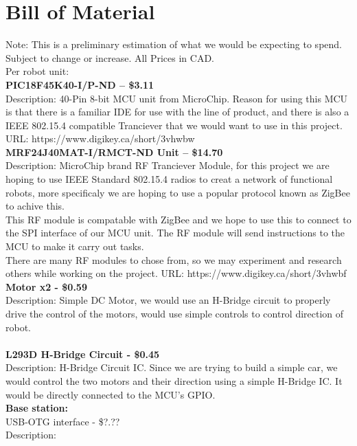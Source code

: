 \documentclass[a4paper]{article}
\begin{document}
	\section*{Bill of Material}
	Note: This is a preliminary estimation of what we would be expecting to spend. Subject to change or increase. All Prices in CAD. \\
	Per robot unit: \\
	
	\textbf{PIC18F45K40-I/P-ND – \$3.11} \\
	Description: 40-Pin 8-bit MCU unit from MicroChip. Reason for using this MCU is that there is a familiar IDE for use with the line of product, and there is also a IEEE 802.15.4 compatible Tranciever that we would want to use in this project.
	URL: https://www.digikey.ca/short/3vhwbw \\
	
	\textbf{MRF24J40MAT-I/RMCT-ND Unit – \$14.70} \\
	Description: MicroChip brand RF Tranciever Module, for this project we are hoping to use IEEE Standard 802.15.4 radios to creat a network of functional robots, more specificaly we are hoping to use a popular protocol known as ZigBee to achive this. \\
	
	This RF module is compatable with ZigBee and we hope to use this to connect to the SPI interface of our MCU unit. The RF module will send instructions to the MCU to make it carry out tasks. \\
	
	There are many RF modules to chose from, so we may experiment and research others while working on the project.
	URL: https://www.digikey.ca/short/3vhwbf \\
	
	
	\textbf{Motor x2 - \$0.59} \\
	Description: Simple DC Motor, we would use an H-Bridge circuit to properly drive the control of the motors, would use simple controls to control direction of robot. \\ \\
	
	\textbf{L293D H-Bridge Circuit - \$0.45} \\
	Description: H-Bridge Circuit IC. Since we are trying to build a simple car, we would control the two motors and their direction using a simple H-Bridge IC. It would be directly connected to the MCU's GPIO. \\
	
	\textbf{Base station:} \\
	USB-OTG interface - \$?.?? \\
	Description:
\end{document}
